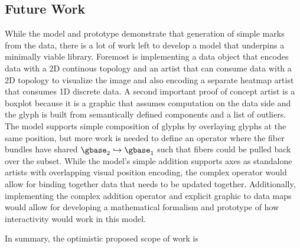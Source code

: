 \documentclass[../main.tex]{subfiles}
\begin{document}
\subsection{Future Work}
While the model and prototype demonstrate that generation of simple marks from the data, there is a lot of work left to develop a model that underpins a minimally viable library. Foremost is implementing a data object that encodes data with a 2D continous topology and an artist that can consume data with a 2D topology to visualize the image\cite{toryRethinkingVisualizationHighlevel2004, haber1990visualization,hansen2011visualization} and also encoding a separate heatmap\cite{wilkinsonHistoryClusterHeat2009,loua1873atlas} artist that consumes 1D discrete data.  A second important proof of concept artist is a boxplot\cite{wickham40YearsBoxplots2011} because it is a graphic that assumes computation on the data side and the glyph is built from semantically defined components and a list of outliers. The model supports simple composition of glyphs by overlaying glyphs at the same position, but more work is needed to define an operator where the fiber bundles have shared $\gbase_2 \hookrightarrow \gbase_1$ such that fibers could be pulled back over the subset. While the model's simple addition supports axes as standalone artists with overlapping visual position encoding, the complex operator would allow for binding together data that needs to be updated together. Additionally, implementing the complex addition operator and explicit graphic to data maps would allow for developing a mathematical formalism and prototype of how interactivity would work in this model.

In summary, the optimistic proposed scope of work is
\end{document}
